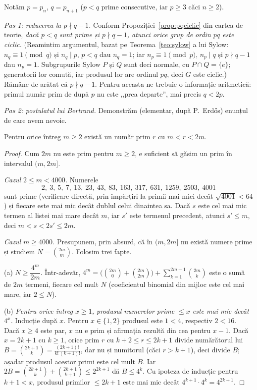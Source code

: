 \begin{solutie}
Notăm $p=p_{n}$, $q=p_{n+1}$ ($p<q$ prime consecutive, iar $p\ge 3$
căci $n\ge 2$).

\smallskip
\textit{Pas 1: reducerea la $p\nmid q-1$.} Conform
Propoziției~\ref{prop:pqciclic} din cartea de teorie, \emph{dacă
$p<q$ sunt prime și $p\nmid q-1$, atunci orice grup de ordin $pq$ este
ciclic.} (Reamintim argumentul, bazat pe Teorema~\ref{teo:sylow} a lui
Sylow: $n_{q}\equiv 1\pmod q$ și $n_{q}\mid p$, $p<q$ dau $n_{q}=1$;
iar $n_{p}\equiv 1\pmod p$, $n_{p}\mid q$ și $p\nmid q-1$ dau
$n_{p}=1$. Subgrupurile Sylow $P$ și $Q$ sunt deci normale, cu
$P\cap Q=\{e\}$; generatorii lor comută, iar produsul lor are ordinul
$pq$, deci $G$ este ciclic.) Rămâne de arătat că $p\nmid q-1$.
Pentru aceasta ne trebuie o informație aritmetică: primul număr prim
de după $p$ nu este ,,prea departe'', mai precis $q<2p$.

\smallskip
\textit{Pas 2: postulatul lui Bertrand.} Demonstrăm (elementar, după
P.~Erdős) enunțul de care avem nevoie.

\begin{lemat}
Pentru orice întreg $m\ge 2$ există un număr prim $r$ cu $m<r<2m$.
\end{lemat}

\begin{proof}
Cum $2m$ nu este prim pentru $m\ge 2$, e suficient să găsim un prim în
intervalul $(m,2m]$.

\emph{Cazul $2\le m<4000$.} Numerele
\[
  2,\ 3,\ 5,\ 7,\ 13,\ 23,\ 43,\ 83,\ 163,\ 317,\ 631,\ 1259,\ 2503,\ 4001
\]
sunt prime (verificare directă, prin împărțiri la primii mai mici
decât $\sqrt{4001}<64$) și fiecare este mai mic decât dublul celui
dinaintea sa. Dacă $s$ este cel mai mic termen al listei mai mare
decât $m$, iar $s'$ este termenul precedent, atunci $s'\le m$, deci
$m<s<2s'\le 2m$.

\emph{Cazul $m\ge 4000$.} Presupunem, prin absurd, că în $(m,2m]$ nu
există numere prime și studiem $N=\binom{2m}{m}$. Folosim trei fapte.

(a) $N\ge\dfrac{4^{m}}{2m}$. Într-adevăr,
$4^{m}=\bigl(\binom{2m}{0}+\binom{2m}{2m}\bigr)+\sum_{k=1}^{2m-1}\binom{2m}{k}$
este o sumă de $2m$ termeni, fiecare cel mult $N$ (coeficientul
binomial din mijloc este cel mai mare, iar $2\le N$).

(b) \emph{Pentru orice întreg $x\ge 1$, produsul numerelor prime
$\le x$ este mai mic decât $4^{x}$.} Inducție după $x$. Pentru
$x\in\{1,2\}$ produsul este $1<4$, respectiv $2<16$. Dacă $x\ge 4$ este par,
$x$ nu e prim și afirmația rezultă din cea pentru $x-1$. Dacă
$x=2k+1$ cu $k\ge 1$, orice prim $r$ cu $k+2\le r\le 2k+1$ divide
numărătorul lui $B=\binom{2k+1}{k}=\frac{(2k+1)!}{k!\,(k+1)!}$, dar nu
și numitorul (căci $r>k+1$), deci divide $B$; așadar produsul acestor primi este cel
mult $B$. Iar $2B=\binom{2k+1}{k}+\binom{2k+1}{k+1}\le 2^{2k+1}$ dă
$B\le 4^{k}$. Cu ipoteza de inducție pentru $k+1<x$, produsul primilor
$\le 2k+1$ este mai mic decât $4^{k+1}\cdot 4^{k}=4^{2k+1}$.


\end{proof}
\end{solutie}
